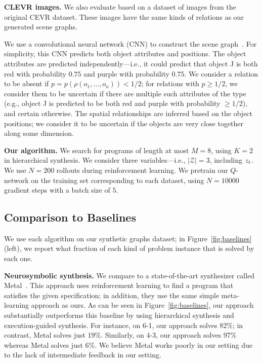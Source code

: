 \textbf{CLEVR images.}
%
We also evaluate based on a dataset of images from the original CEVR dataset. These images have the same kinds of relations as our generated scene graphs.

We use a convolutional neural network (CNN) to construct the scene graph~\cite{yi2018neural}. For simplicity, this CNN predicts both object attributes and positions. The object attributes are predicted independently---i.e., it could predict that object J is both red with probability $0.75$ and purple with probability $0.75$. We consider a relation to be absent if $p=p(\rho(o_1,...,o_n))<1/2$; for relations with $p\ge1/2$, we consider them to be uncertain if there are multiple such attributes of the type (e.g., object J is predicted to be both red and purple with probability $\ge1/2$), and certain otherwise. The spatial relationships are inferred based on the object positions; we consider it to be uncertain if the objects are very close together along some dimension.

\textbf{Our algorithm.}
%
We search for programs of length at most $M=8$, using $K=2$ in hierarchical synthesis. We consider three variables---i.e., $|\mathcal{Z}|=3$, including $z_{t}$. We use $N=200$ rollouts during reinforcement learning. We pretrain our $Q$-network on the training set corresponding to each dataset, using $N=10000$ gradient steps with a batch size of $5$.

\subsection{Comparison to Baselines}

We use each algorithm on our synthetic graphs dataset; in Figure~\ref{fig:baselines} (left), we report what fraction of each kind of problem instance that is solved by each one.

\textbf{Neurosymbolic synthesis.}
%
We compare to a state-of-the-art synthesizer called Metal~\cite{si2018learning}. This approach uses reinforcement learning to find a program that satisfies the given specification; in addition, they use the same simple meta-learning approach as ours. As can be seen in Figure~\ref{fig:baselines}, our approach substantially outperforms this baseline by using hierarchical synthesis and execution-guided synthesis. For instance, on 6-1, our approach solves 82\%; in contrast, Metal solves just 19\%. Similarly, on 4-3, our approach solves 97\% whereas Metal solves just 6\%. We believe Metal works poorly in our setting due to the lack of intermediate feedback in our setting.

